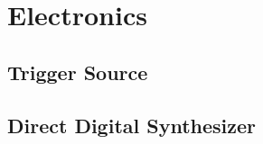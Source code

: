 \chapter{Electronics}

\section{Trigger Source}
\label{app:elec:trig}

\section{Direct Digital Synthesizer}
\label{app:elec:dds}
